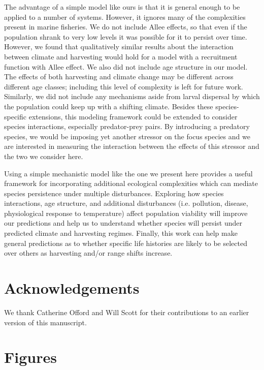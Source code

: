 \documentclass[12pt,english]{article}
\begin{document}
\begin{spacing}{1.9}
\begin{flushleft}
The advantage of a simple model like ours is that it is general enough to be applied to a number of systems.  However, it  ignores many of the complexities present in marine fisheries. We do not include Allee effects, so that even if the population shrank to very low levels it was possible for it to persist over time. However, we found that qualitatively similar results about the interaction between climate and harvesting would hold for a model with a recruitment function with Allee effect. We also did not include age structure in our model. The effects of both harvesting and climate change may be different across different age classes; including this level of complexity is left for future work. Similarly, we did not include any mechanisms aside from larval dispersal by which the population could keep up with a shifting climate.  Besides these species-specific extensions, this modeling framework could be extended to consider species interactions, especially predator-prey pairs.  By introducing a predatory species, we would be imposing yet another stressor on the focus species \citep{Lingetal2009, Gurevitchetal2000}and we are interested in measuring the interaction between the effects of this stressor and the two we consider here.

Using a simple mechanistic model like the one we present here provides a useful framework for incorporating additional ecological complexities which can mediate species persistence under multiple disturbances. Exploring how species interactions, age structure, and additional disturbances (i.e. pollution, disease, physiological response to temperature) affect population viability will improve our predictions and help us to understand whether species will persist under predicted climate and harvesting regimes. Finally, this work can help make general predictions as to whether specific life histories are likely to be selected over others as harvesting and/or range shifts increase.


\section*{ Acknowledgements}
We thank Catherine Offord and Will Scott for their contributions to an earlier version of this manuscript. 

\end{flushleft}
\end{spacing}


\pagebreak
\section{Figures}
\end{document}
